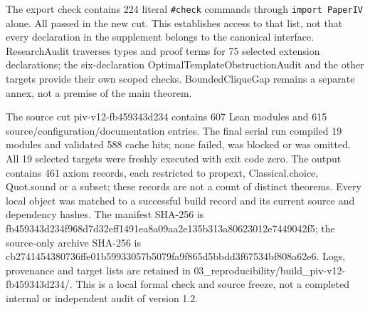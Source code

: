 \documentclass[english,11pt,a4paper]{article}
\newcounter{none}
\begin{document}
The export check contains 224 literal \nolinkurl{\#check} commands through \texttt{import\ PaperIV} alone. All passed in the new cut. This establishes access to that list, not that every declaration in the supplement belongs to the canonical interface. ResearchAudit traverses types and proof terms for 75 selected extension declarations; the six-declaration OptimalTemplateObstructionAudit and the other targets provide their own scoped checks. BoundedCliqueGap remains a separate annex, not a premise of the main theorem.

The source cut {\ttfamily\small piv-\discretionary{\hbox{\ensuremath{\hookrightarrow}}}{}{}v12-\discretionary{\hbox{\ensuremath{\hookrightarrow}}}{}{}fb459343d234} contains 607 Lean modules and 615 source/\allowbreak{}configuration/\allowbreak{}documentation entries. The final serial run compiled 19 modules and validated 588 cache hits; none failed, was blocked or was omitted. All 19 selected targets were freshly executed with exit code zero. The output contains 461 axiom records, each restricted to {\ttfamily\small propext}, {\ttfamily\small Classical.\discretionary{\hbox{\ensuremath{\hookrightarrow}}}{}{}choice}, {\ttfamily\small Quot.\discretionary{\hbox{\ensuremath{\hookrightarrow}}}{}{}sound} or a subset; these records are not a count of distinct theorems. Every local object was matched to a successful build record and its current source and dependency hashes. The manifest SHA-256 is {\ttfamily\small fb459343d234\discretionary{\hbox{\ensuremath{\hookrightarrow}}}{}{}f968d7d32eff\discretionary{\hbox{\ensuremath{\hookrightarrow}}}{}{}1491ea8a09aa\discretionary{\hbox{\ensuremath{\hookrightarrow}}}{}{}2e135b313a80\discretionary{\hbox{\ensuremath{\hookrightarrow}}}{}{}623012e74490\discretionary{\hbox{\ensuremath{\hookrightarrow}}}{}{}42f5}; the source-only archive SHA-256 is {\ttfamily\small cb2741454380\discretionary{\hbox{\ensuremath{\hookrightarrow}}}{}{}736ffe01b599\discretionary{\hbox{\ensuremath{\hookrightarrow}}}{}{}33057b5079fa\discretionary{\hbox{\ensuremath{\hookrightarrow}}}{}{}9f865d5bbdd3\discretionary{\hbox{\ensuremath{\hookrightarrow}}}{}{}f67534bf808a\discretionary{\hbox{\ensuremath{\hookrightarrow}}}{}{}62e6}. Logs, provenance and target lists are retained in {\ttfamily\small 03\_\discretionary{\hbox{\ensuremath{\hookrightarrow}}}{}{}reproducibil\discretionary{\hbox{\ensuremath{\hookrightarrow}}}{}{}ity/\discretionary{\hbox{\ensuremath{\hookrightarrow}}}{}{}build\_\discretionary{\hbox{\ensuremath{\hookrightarrow}}}{}{}piv-\discretionary{\hbox{\ensuremath{\hookrightarrow}}}{}{}v12-\discretionary{\hbox{\ensuremath{\hookrightarrow}}}{}{}fb459343d234\discretionary{\hbox{\ensuremath{\hookrightarrow}}}{}{}/}. This is a local formal check and source freeze, not a completed internal or independent audit of version 1.2.
\end{document}
